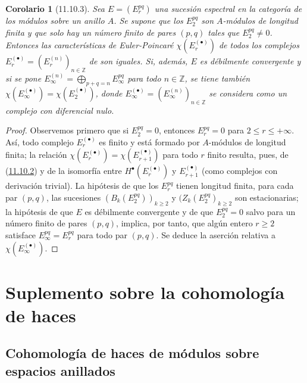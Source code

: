 \documentclass[10pt,oneside,openany]{book}
\theoremstyle{egaenv}\newtheorem*{env}{---}
\theoremstyle{egastatement}
\newtheorem*{corollary}{Corolario}
\theoremstyle{egadescription}
\renewcommand{\leq}{\leqslant}
\renewcommand{\geq}{\geqslant}
\begin{document}
\begin{corollary}[11.10.3]
\label{0.11.10.3}
\label{0.11.10.3-fr}
Sea $E=(E_r^{pq})$ una sucesión espectral en la
categoría de los módulos sobre un anillo $A$.
Se supone que los $E_2^{pq}$ son $A$-módulos de longitud finita y que solo hay un número finito de pares $(p,q)$ tales que $E_2^{pq}\neq0$. Entonces las características de Euler-Poincaré
$\chi(E_r^{(\bullet)})$
de todos los complejos
$E_r^{(\bullet)}=(E_r^{(n)})_{n\in\mathbb Z}$
de  son iguales.
Si, además, $E$ es débilmente convergente y si se pone $E_\infty^{(n)}=\bigoplus_{p+q=n}E_\infty^{pq}$ para todo $n\in\mathbb Z$, se tiene también $\chi(E_\infty^{(\bullet)})=\chi(E_2^{(\bullet)})$,
donde
$E_\infty^{(\bullet)}=(E_\infty^{(n)})_{n\in\mathbb Z}$
se considera como un complejo con diferencial nulo.
\end{corollary}

\begin{proof}
Observemos primero que si $E_2^{pq}=0$, entonces
$E_r^{pq}=0$ para $2\leq r\leq+\infty$.
Así, todo complejo $E_r^{(\bullet)}$ es finito y está formado por
$A$-módulos de longitud finita; la relación $\chi(E_r^{(\bullet)})=\chi(E_{r+1}^{(\bullet)})$ para todo $r$ finito resulta, pues, de (\hyperref[0.11.10.2-fr]{11.10.2}) y de la isomorfía entre $H^\bullet(E_r^{(\bullet)})$ y $E_{r+1}^{(\bullet)}$ (como complejos con derivación trivial). La hipótesis de que los $E_r^{pq}$ tienen longitud finita, para cada par
$(p,q)$, las sucesiones
$(B_k(E_2^{pq}))_{k\geq2}$ y $(Z_k(E_2^{pq})_{k\geq2}$ son estacionarias;
la hipótesis de que $E$ es débilmente convergente y de que $E_2^{pq}=0$ salvo para un número finito de pares $(p,q)$, implica, por tanto,
que algún entero $r\geq2$ satisface
$E_\infty^{pq}=E_r^{pq}$
para todo par $(p,q)$.
Se deduce la aserción relativa a
$\chi(E_\infty^{(\bullet)})$.
\end{proof}



\section{Suplemento sobre la cohomología de haces}
\label{section:0.12}
\label{section:0.12-fr}

\subsection{Cohomología de haces de módulos sobre espacios anillados}
\label{subsection:0.12.1}
\label{subsection:0.12.1-fr}
\end{document}
